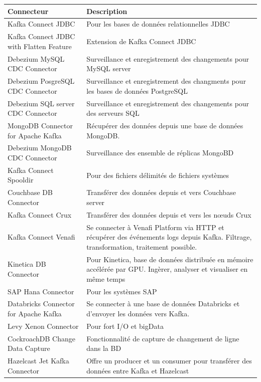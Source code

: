 \documentclass{article}
\begin{document}
			\begin{longtable}{|p{7.5cm}|p{7.5cm}|}
				\hline
				\rowcolor{lightgray} Connecteur & Description\\\hline
				\endhead
				Kafka Connect JDBC & Pour les bases de données relationnelles JDBC\\\hline
				Kafka Connect JDBC with Flatten Feature & Extension de Kafka Connect JDBC\\\hline
				Debezium MySQL CDC Connector & Surveillance et enregistrement des changements pour MySQL server\\\hline
				Debezium PosgreSQL CDC Connector & Surveillance et enregistrement des changments pour les bases de données PostgreSQL\\\hline
				Debezium SQL server CDC Connector & Surveillance et enregistrement des changements pour des serveurs SQL\\\hline
				MongoDB Connector for Apache Kafka & Récupérer des données depuis une base de données MongoDB.\\\hline
				Debezium MongoDB CDC Connector & Surveillance des ensemble de réplicas MongoBD\\\hline
				Kafka Connect Spooldir & Pour des fichiers délimités de fichiers systèmes\\\hline
				Couchbase DB Connector & Transférer des données depuis et vers Couchbase server\\\hline
				Kafka Connect Crux & Transférer des données depuis et vers les nœuds Crux\\\hline
				Kafka Connect Venafi & Se connecter à Venafi Platform via HTTP et récupérer des événements logs depuis Kafka. Filtrage, transformation, traitement possible.\\\hline
				Kinetica DB Connector & Pour Kinetica, base de données distribuée en mémoire accélérée par GPU. Ingèrer, analyser et visualiser en même temps\\\hline
				SAP Hana Connector & Pour les systèmes SAP\\\hline
				Databricks Connector for Apache Kafka & Se connecter à une base de données Databricks et d'envoyer les données vers Kafka.\\\hline
				Levy Xenon Connector & Pour fort I/O et bigData\\\hline
				CockroachDB Change Data Capture & Fonctionnalité de capture de changement de ligne dans la BD\\\hline
				Hazelcast Jet Kafka Connector & Offre un producer et un consumer pour transférer des données entre Kafka et Hazelcast\\\hline

\end{longtable}
\end{document}
